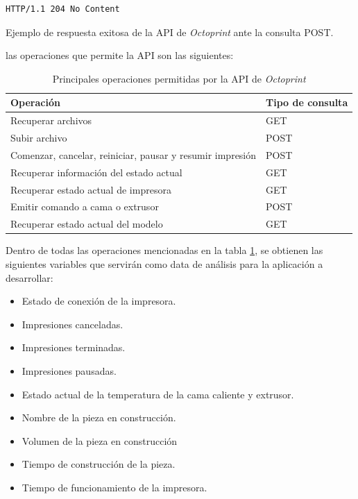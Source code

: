 \begin{table}[H]
\begin{lstlisting}
HTTP/1.1 204 No Content
\end{lstlisting}
\caption{Ejemplo de respuesta exitosa de la API de \textit{Octoprint} ante la consulta POST.}
\end{table}

las operaciones que permite la API son las siguientes:

\begin{table}[H]
\centering
\begin{tabular}{|p{4cm}|p{3cm}|}
\hline
Operación & Tipo de consulta \\
\hline 
Recuperar archivos & GET \\
\hline
Subir archivo & POST\\
\hline
Comenzar, cancelar, reiniciar, pausar y resumir impresión & POST \\
\hline
Recuperar información del estado actual & GET\\
\hline
Recuperar estado actual de impresora & GET\\
\hline
Emitir comando a cama o extrusor & POST\\
\hline
Recuperar estado actual del modelo & GET\\
\hline
\end{tabular}
\caption{Principales operaciones permitidas por la API de \textit{Octoprint}}
\label{api-octo}
\end{table}

Dentro de todas las operaciones mencionadas en la tabla \ref{api-octo}, se obtienen las siguientes variables que servirán como data de análisis para la aplicación a desarrollar:

\begin{itemize}
\item Estado de conexión de la impresora.
\item Impresiones canceladas.
\item Impresiones terminadas.
\item Impresiones pausadas.
\item Estado actual de la temperatura de la cama caliente y extrusor.
\item Nombre de la pieza en construcción.
\item Volumen de la pieza en construcción
\item Tiempo de construcción de la pieza.
\item Tiempo de funcionamiento de la impresora.
\end{itemize}

